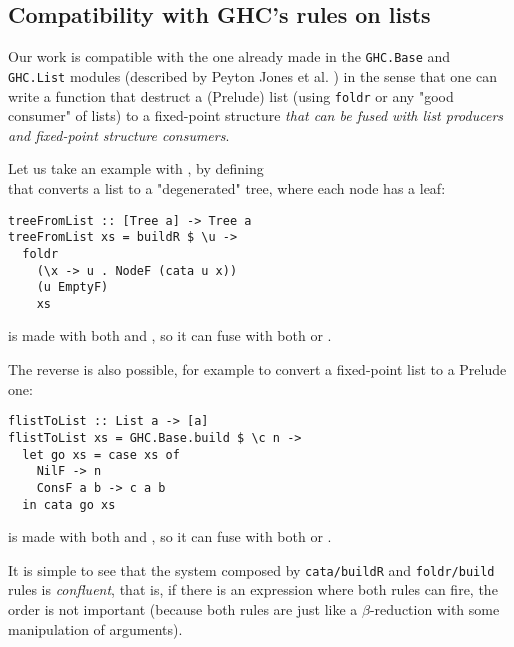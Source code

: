 \subsection{Compatibility with GHC's rules on lists}
Our work is compatible with the one already made in the \verb|GHC.Base| and \verb|GHC.List| modules (described by Peyton Jones et al. \cite{pbr}) in the sense that one can write a function that destruct a (Prelude) list (using \verb|foldr| or any "good consumer" of lists) to a fixed-point structure \emph{that can be fused with list producers and fixed-point structure consumers}.

Let us take an example with , by defining\\  that converts a list to a "degenerated" tree, where each node has a leaf:
\begin{verbatim}
treeFromList :: [Tree a] -> Tree a
treeFromList xs = buildR $ \u ->
  foldr
    (\x -> u . NodeF (cata u x))
    (u EmptyF)
    xs
\end{verbatim}
\noindent {} is made with both  and , so it can fuse with both  or .

The reverse is also possible, for example to convert a fixed-point list to a Prelude one:
\begin{verbatim}
flistToList :: List a -> [a]
flistToList xs = GHC.Base.build $ \c n ->
  let go xs = case xs of
    NilF -> n
    ConsF a b -> c a b
  in cata go xs
\end{verbatim}
\noindent {} is made with both  and , so it can fuse with both  or .

It is simple to see that the system composed by \verb|cata/buildR| and \verb|foldr/build| rules is \emph{confluent}, that is, if there is an expression where both rules can fire, the order is not important (because both rules are just like a $\beta$-reduction with some manipulation of arguments).
